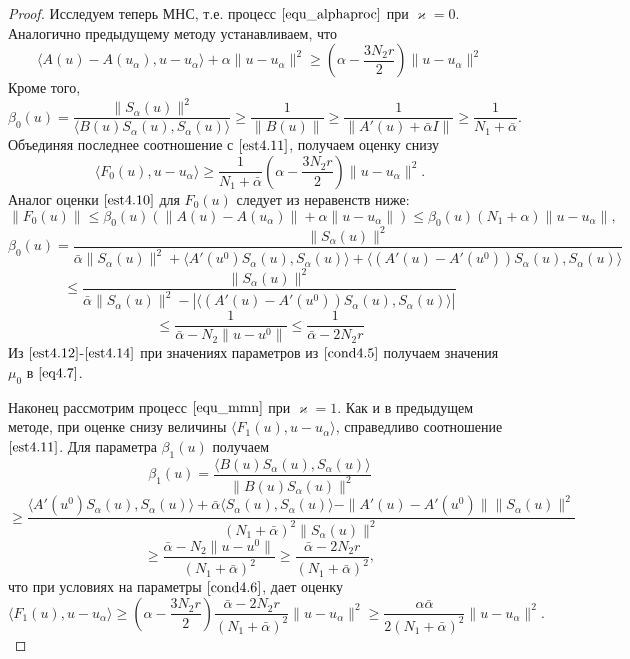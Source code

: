 \begin{proof}
Исследуем теперь МНС, т.е. процесс $\eqref{equ_alphaproc}$ при $\varkappa=0$. Аналогично предыдущему методу устанавливаем, что
\begin{equation}\label{est4.11}
\langle A(u)-A(u_\alpha), u-u_\alpha\rangle+\alpha\|u-u_\alpha\|^2\ge\left(\alpha-\frac{3N_2 r}{2}\right)\|u-u_\alpha\|^2
\end{equation}
Кроме того,
$$\beta_0(u)=\frac{\|S_\alpha(u)\|^2}{\langle B(u)S_\alpha(u), S_\alpha(u)\rangle}\ge\frac{1}{\|B(u)\|}\ge\frac{1}{\|A'(u)+\bar\alpha I\|}\ge\frac{1}{N_1+\bar\alpha}.$$
Объединяя последнее соотношение с $\eqref{est4.11}$, получаем оценку снизу
\begin{equation}\label{est4.12}
\langle F_0(u), u-u_\alpha\rangle\ge\frac{1}{N_1+\bar\alpha}\left (\alpha -\frac{3N_2 r}{2}\right )\|u-u_\alpha\|^2.
\end{equation}
Аналог оценки $\eqref{est4.10}$ для $F_0(u)$ следует из неравенств ниже:
\begin{equation}\label{est4.13}
\|F_0(u)\|\le\beta_0(u)(\|A(u)-A(u_\alpha)\|+\alpha\|u-u_\alpha\|)\le\beta_0(u)(N_1+\alpha)\|u-u_\alpha\|,
\end{equation}
$$\beta_0(u)=\frac{\|S_\alpha(u)\|^2}{\bar\alpha\|S_\alpha(u)\|^2+\langle A'(u^0)S_\alpha(u), S_\alpha(u)\rangle+\langle (A'(u)-A'(u^0))S_\alpha(u), S_\alpha(u)\rangle}$$
$$\le \frac{\|S_\alpha(u)\|^2}{\bar\alpha\|S_\alpha(u)\|^2-|\langle (A'(u)-A'(u^0))S_\alpha(u), S_\alpha(u)\rangle|}$$
\begin{equation}\label{est4.14}
\le\frac{1}{\bar\alpha -N_2\|u-u^0\|}\le\frac{1}{\bar\alpha -2N_2 r}
\end{equation}
Из $\eqref{est4.12}$-$\eqref{est4.14}$ при значениях параметров из $\eqref{cond4.5}$ получаем значения $\mu_0$ в $\eqref{eq4.7}$.

Наконец рассмотрим процесс $\eqref{equ_mmn}$ при $\varkappa=1$. Как и в предыдущем методе, при оценке снизу величины $\langle F_1(u), u-u_\alpha\rangle$, справедливо соотношение $\eqref{est4.11}$. Для параметра $\beta_1(u)$ получаем
$$\beta_1(u)=\frac{\langle B(u)S_\alpha(u), S_\alpha(u)\rangle}{\|B(u)S_\alpha(u)\|^2}$$$$\ge\frac{\langle A'(u^0)S_\alpha(u), S_\alpha(u)\rangle+\bar\alpha\langle S_\alpha(u), S_\alpha(u)\rangle-\|A'(u)-A'(u^0)\|\|S_\alpha(u)\|^2}{(N_1+\bar\alpha)^2\|S_\alpha(u)\|^2}$$$$\ge\frac{\bar\alpha -N_2\|u-u^0\|}{(N_1+\bar\alpha)^2}\ge\frac{\bar\alpha -2N_2 r}{(N_1+\bar\alpha)^2},$$
что при условиях на параметры $\eqref{cond4.6}$, дает оценку
\begin{equation}\label{est4.15}
\langle F_1(u), u-u_\alpha\rangle\ge\left (\alpha -\frac{3N_2 r}{2}\right )\frac{\bar\alpha - 2N_2 r}{(N_1+\bar\alpha)^2}\|u-u_\alpha\|^2\ge\frac{\alpha\bar\alpha}{2(N_1+\bar\alpha)^2}\|u-u_\alpha\|^2.
\end{equation}


\end{proof}
